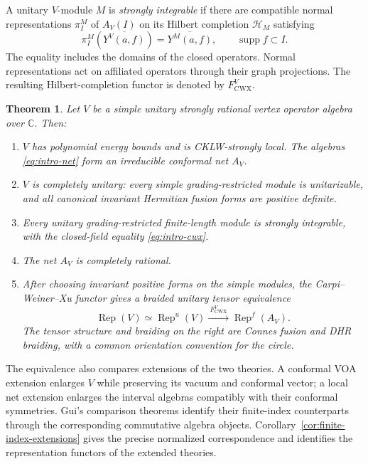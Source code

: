 \documentclass[11pt]{article}
\numberwithin{equation}{section}
\newtheorem{theorem}{Theorem}[section]
\theoremstyle{definition}
\theoremstyle{remark}
\DeclareMathOperator{\Rep}{Rep}
\DeclareMathOperator{\supp}{supp}
\begin{document}
A unitary $V$-module $M$ is \emph{strongly integrable} if there are compatible normal representations $\pi_I^M$ of $A_V(I)$ on its Hilbert completion $\mathcal H_M$ satisfying
\begin{equation}\label{eq:intro-cwx}
 \pi_I^M\!\left(\overline{Y^V(a,f)}\right)
   =\overline{Y^M(a,f)},\qquad \supp f\subset I.
\end{equation}
The equality includes the domains of the closed operators. Normal representations act on affiliated operators through their graph projections. The resulting Hilbert-completion functor is denoted by $F_{\mathrm{CWX}}^V$.

\begin{theorem}\label{thm:main}
Let $V$ be a simple unitary strongly rational vertex operator algebra over $\mathbb C$. Then:
\begin{enumerate}[label=\textup{(\arabic*)}]
\item $V$ has polynomial energy bounds and is CKLW-strongly local. The algebras \eqref{eq:intro-net} form an irreducible conformal net $A_V$.
\item $V$ is completely unitary: every simple grading-restricted module is unitarizable, and all canonical invariant Hermitian fusion forms are positive definite.
\item Every unitary grading-restricted finite-length module is strongly integrable, with the closed-field equality \eqref{eq:intro-cwx}.
\item The net $A_V$ is completely rational.
\item After choosing invariant positive forms on the simple modules, the Carpi--Weiner--Xu functor gives a braided unitary tensor equivalence
\[
 \Rep(V)\simeq\Rep^u(V)
 \xrightarrow{\ F_{\mathrm{CWX}}^V\ }\Rep^f(A_V).
\]
The tensor structure and braiding on the right are Connes fusion and DHR braiding, with a common orientation convention for the circle.
\end{enumerate}
\end{theorem}

The equivalence also compares extensions of the two theories. A conformal VOA extension enlarges $V$ while preserving its vacuum and conformal vector; a local net extension enlarges the interval algebras compatibly with their conformal symmetries. Gui's comparison theorems identify their finite-index counterparts through the corresponding commutative algebra objects. Corollary~\ref{cor:finite-index-extensions} gives the precise normalized correspondence and identifies the representation functors of the extended theories.
\end{document}
